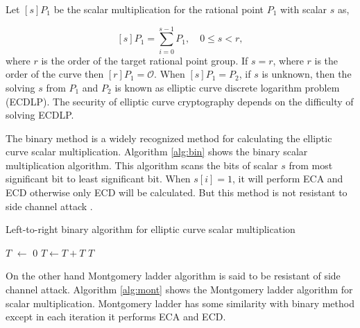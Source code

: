         Let $[s]P_1$ be the scalar multiplication for the rational point $P_1$ with scalar $s$ as,
        
        \begin{equation}\label{scalar_mul}
        [s]P_1 = \sum_{i=0}^{s-1} P_1, \quad \text{$0 \leq s < r$},
        \end{equation}
        where $r$ is the order of the target rational point group. If $s = r$, where $r$ is the order of the curve then $[r]P_1 = \mathcal{O}$. When $[s]P_1 = P_2$, if $s$ is unknown, then the solving $s$ from $P_1$ and $P_2$ is known as elliptic curve discrete logarithm problem (ECDLP). The security of elliptic curve cryptography depends on the difficulty of solving ECDLP.
        
        The binary method is a widely recognized method for calculating the elliptic curve scalar multiplication. Algorithm \ref{alg:bin} shows the binary scalar multiplication algorithm. This algorithm scans the bits of scalar $s$ from  most significant bit to least significant bit. When $s[i] = 1$, it will perform ECA and ECD otherwise only ECD will be calculated. But this method is not resistant to side channel attack \cite{sca}.  
        
         \begin{algorithm}[H]
          \caption{Left-to-right binary algorithm for elliptic curve scalar multiplication}
          \label{alg:bin}
          \DontPrintSemicolon
          \hspace{-3ex}
          \;
          \hspace{-3ex}
           \;%
          \nl $T$ $ \leftarrow$ $0$ \;
          \nl {} {\;
                  $T \leftarrow T  + T$\;
              }\;
          \nl {} $T$\;
          \end{algorithm}
        
        On the other hand Montgomery ladder algorithm is said to be resistant of side channel attack. Algorithm \ref{alg:mont} shows the Montgomery ladder algorithm for scalar multiplication. Montgomery ladder has some similarity with binary method except in each iteration it performs ECA and ECD. 
        

